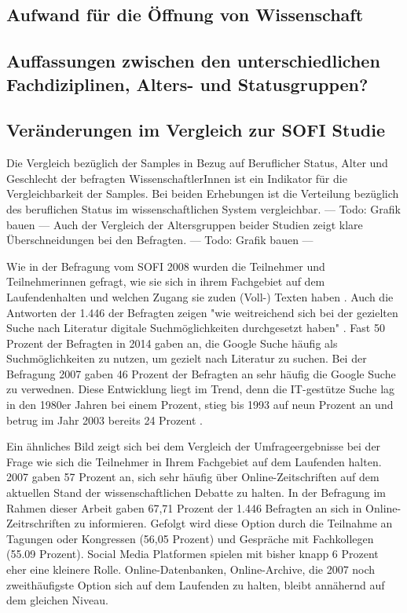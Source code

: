 \subsection{Aufwand für die Öffnung von Wissenschaft}

\subsection{Auffassungen zwischen den unterschiedlichen Fachdiziplinen, Alters- und Statusgruppen?}

\subsection{Veränderungen im Vergleich zur SOFI Studie}

Die Vergleich bezüglich der Samples in Bezug auf Beruflicher Status, Alter und Geschlecht der befragten WissenschaftlerInnen ist ein Indikator für die Vergleichbarkeit der Samples. Bei beiden Erhebungen ist die Verteilung bezüglich des beruflichen Status im wissenschaftlichen System vergleichbar.
--- Todo: Grafik bauen --- 
Auch der Vergleich der Altersgruppen beider Studien zeigt klare Überschneidungen bei den Befragten.  --- Todo: Grafik bauen --- 

Wie in der Befragung vom SOFI 2008 wurden die Teilnehmer und Teilnehmerinnen gefragt, wie sie sich in ihrem Fachgebiet auf dem Laufendenhalten und welchen Zugang sie zuden (Voll-) Texten haben \cite{hanekop_2008}. Auch die Antworten der 1.446 der Befragten zeigen "wie weitreichend sich bei der gezielten Suche nach Literatur digitale Suchmöglichkeiten durchgesetzt haben" \cite{hanekop_2008}. Fast 50 Prozent der Befragten in 2014 gaben an, die Google Suche häufig als Suchmöglichkeiten zu nutzen, um gezielt nach Literatur zu suchen. Bei der Befragung 2007 gaben 46 Prozent der Befragten an sehr häufig die Google Suche zu verwednen. Diese Entwicklung liegt im Trend, denn die IT-gestütze Suche lag in den 1980er Jahren bei einem Prozent, stieg bis 1993 auf neun Prozent an und betrug im Jahr 2003 bereits 24 Prozent \cite{hanekop_2008}.

Ein ähnliches Bild zeigt sich bei dem Vergleich der Umfrageergebnisse bei der Frage wie sich die Teilnehmer in Ihrem Fachgebiet auf dem Laufenden halten. 2007 gaben 57 Prozent an, sich sehr häufig über Online-Zeitschriften auf dem aktuellen Stand der wissenschaftlichen Debatte zu halten. In der Befragung im Rahmen dieser Arbeit gaben 67,71 Prozent der 1.446 Befragten an sich in Online-Zeitrschriften zu informieren. Gefolgt wird diese Option durch die Teilnahme an Tagungen oder Kongressen (56,05 Prozent) und Gespräche mit Fachkollegen (55.09 Prozent). Social Media Platformen spielen mit bisher knapp 6 Prozent eher eine kleinere Rolle. Online-Datenbanken, Online-Archive, die 2007 noch zweithäufigste Option sich auf dem Laufenden zu halten, bleibt annähernd auf dem gleichen Niveau.

